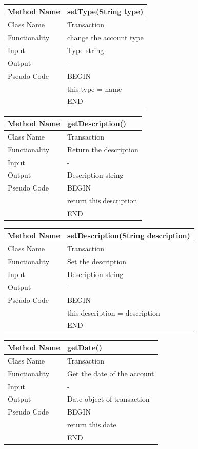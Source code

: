 \documentclass[12pt]{article}
\begin{document}
\begin{tabular}{ |p{3cm}||p{\colWidth}|  }
	\hline
	Method Name &  setType(String type) \\
	\hline
	Class Name & Transaction\\
	\hline
	Functionality &  change the account type\\
	\hline
	Input & Type string\\
	\hline
	Output & -\\
	\hline
	Pseudo Code& BEGIN \\ & this.type = name\\ & END\\
	\hline
\end{tabular}



\begin{tabular}{ |p{3cm}||p{\colWidth}|  }
	\hline
	Method Name &  getDescription() \\
	\hline
	Class Name & Transaction\\
	\hline
	Functionality &  Return the description \\
	\hline
	Input & - \\
	\hline
	Output & Description string\\
	\hline
	Pseudo Code & BEGIN \\ & return this.description\\& END\\
	\hline
\end{tabular}



\begin{tabular}{ |p{3cm}||p{\colWidth}|  }
	\hline
	Method Name &  setDescription(String description) \\
	\hline
	Class Name & Transaction\\
	\hline
	Functionality &  Set the description \\
	\hline
	Input & Description string \\
	\hline
	Output & -\\
	\hline
	Pseudo Code& BEGIN \\ & this.description = description\\ & END\\
	\hline
\end{tabular}



\begin{tabular}{ |p{3cm}||p{\colWidth}|  }
	\hline
	Method Name &  getDate() \\
	\hline
	Class Name & Transaction\\
	\hline
	Functionality &  Get the date of the account\\
	\hline
	Input & -\\
	\hline
	Output & Date object of transaction\\
	\hline
	Pseudo Code& BEGIN \\ & return this.date\\ & END\\
	\hline
\end{tabular}
\end{document}
